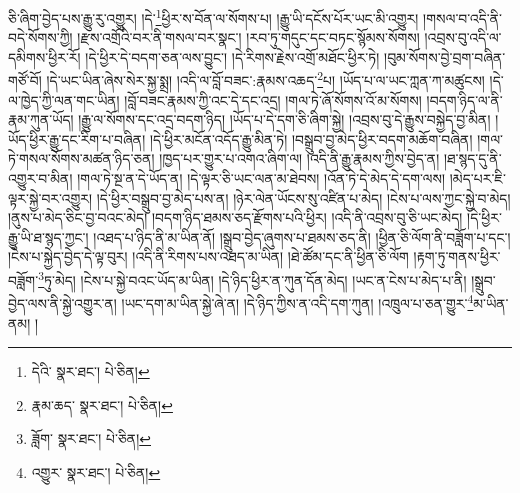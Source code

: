 ཅི་ཞིག་བྱེད་པས་རྒྱུ་རུ་འགྱུར། །དེ་\footnote{དེའི་  སྣར་ཐང་།  པེ་ཅིན། }ཕྱིར་ས་བོན་ལ་སོགས་པ། །རྒྱུ་ཡི་དངོས་པོར་ཡང་མི་འགྱུར། །གསལ་བ་འདི་ནི་བདེ་སོགས་ཀྱི། །རྫས་འགྲོའི་བར་ནི་གསལ་བར་སྣང་། །རབ་ཏུ་གདུང་དང་བཏང་སྙོམས་སོགས། །འབྲས་བུ་འདི་ལ་དམིགས་ཕྱིར་རོ། །དེ་ཕྱིར་དེ་བདག་ཅན་ལས་བྱུང་། །དེ་རིགས་རྗེས་འགྲོ་མཐོང་ཕྱིར་ཏེ། །བུམ་སོགས་བྱེ་བྲག་བཞིན་གཙོ་བོ། །དེ་ཡང་ཡིན་ཞེས་སེར་སྐྱ་སྨྲ། །འདི་ལ་བློ་བཟང་:རྣམས་འཆད་\footnote{རྣམ་ཆད་  སྣར་ཐང་།  པེ་ཅིན། }པ། །ཡོད་པ་ལ་ཡང་ཀླན་ཀ་མཚུངས། །དེ་ལ་ཁྱེད་ཀྱི་ལན་གང་ཡིན། །བློ་བཟང་རྣམས་ཀྱི་འང་དེ་དང་འདྲ། །གལ་ཏེ་ཞོ་སོགས་འོ་མ་སོགས། །བདག་ཉིད་ལ་ནི་རྣམ་ཀུན་ཡོད། །རྒྱུ་ལ་སོགས་དང་འདྲ་བདག་ཉིད། །ཡོད་པ་དེ་དག་ཅི་ཞིག་སྐྱེ། །འབྲས་བུ་དེ་རྒྱུས་བསྐྱེད་བྱ་མིན། །ཡོད་ཕྱིར་རྒྱུ་དང་རིག་པ་བཞིན། །དེ་ཕྱིར་མངོན་འདོད་རྒྱུ་མིན་ཏེ། །བསྒྲུབ་བྱ་མེད་ཕྱིར་བདག་མཆོག་བཞིན། །གལ་ཏེ་གསལ་སོགས་མཚན་ཉིད་ཅན། །ཁྱད་པར་གྱུར་པ་འགའ་ཞིག་ལ། །འདི་ནི་རྒྱུ་རྣམས་ཀྱིས་བྱེད་ན། །ཐ་སྙད་དུ་ནི་འགྱུར་བ་མིན། །གལ་ཏེ་སྔ་ན་དེ་ཡོད་ན། །དེ་ལྟར་ཅི་ཡང་ལན་མ་ཐེབས། །འོན་ཏེ་དེ་མེད་དེ་དག་ལས། །མེད་པར་ཇི་ལྟར་སྐྱེ་བར་འགྱུར། །དེ་ཕྱིར་བསྒྲུབ་བྱ་མེད་པས་ན། །ཉེར་ལེན་ཡོངས་སུ་འཛིན་པ་མེད། །ངེས་པ་ལས་ཀྱང་སྐྱེ་བ་མེད། །ནུས་པ་མེད་ཅིང་བྱ་བའང་མེད། །བདག་ཉིད་ཐམས་ཅད་རྫོགས་པའི་ཕྱིར། །འདི་ནི་འབྲས་བུ་ཅི་ཡང་མེད། །དེ་ཕྱིར་རྒྱུ་ཡི་ཐ་སྙད་ཀྱང་། །འཐད་པ་ཉིད་ནི་མ་ཡིན་ནོ། །སྒྲུབ་བྱེད་ཞུགས་པ་ཐམས་ཅད་ནི། །ཕྱིན་ཅི་ལོག་ནི་བཟློག་པ་དང་། །ངེས་པ་སྐྱེད་བྱེད་དེ་ལྟ་བུར། །འདི་ནི་རིགས་པས་འཐད་མ་ཡིན། །ཐེ་ཚོམ་དང་ནི་ཕྱིན་ཅི་ལོག །རྟག་ཏུ་གནས་ཕྱིར་བཟློག་\footnote{ཟློག་  སྣར་ཐང་།  པེ་ཅིན། }ཏུ་མེད། །ངེས་པ་སྐྱེ་བའང་ཡོད་མ་ཡིན། །དེ་ཉིད་ཕྱིར་ན་ཀུན་དོན་མེད། །ཡང་ན་ངེས་པ་མེད་པ་ནི། །སྒྲུབ་བྱེད་ལས་ནི་སྐྱེ་འགྱུར་ན། །ཡང་དག་མ་ཡིན་སྐྱེ་ཞེ་ན། །དེ་ཉིད་ཀྱིས་ན་འདི་དག་ཀུན། །འཁྲུལ་པ་ཅན་གྱུར་\footnote{འགྱུར་  སྣར་ཐང་།  པེ་ཅིན། }མ་ཡིན་ནམ། །
